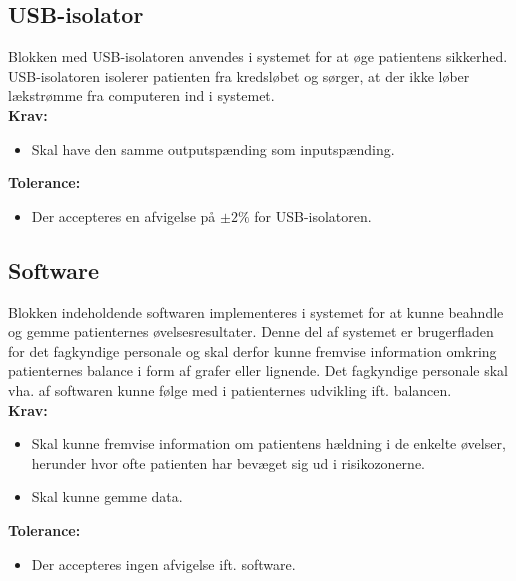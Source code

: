 \subsection{USB-isolator}\label{kravspecifikationer_USB}
Blokken med USB-isolatoren anvendes i systemet for at øge patientens sikkerhed. USB-isolatoren isolerer patienten fra kredsløbet og sørger, at der ikke løber lækstrømme fra computeren ind i systemet.\\
\textbf{Krav:}
\begin{itemize}
	\item Skal have den samme outputspænding som inputspænding. 
\end{itemize}
\textbf{Tolerance:}
\begin{itemize}
	\item Der accepteres en afvigelse på $\pm2\%$ for USB-isolatoren. 
\end{itemize}
\subsection{Software}
Blokken indeholdende softwaren implementeres i systemet for at kunne beahndle og gemme patienternes øvelsesresultater. Denne del af systemet er brugerfladen for det fagkyndige personale og skal derfor kunne fremvise information omkring patienternes balance i form af grafer eller lignende. Det fagkyndige personale skal vha. af softwaren kunne følge med i patienternes udvikling ift. balancen. \\
\textbf{Krav:}
\begin{itemize}
	\item Skal kunne fremvise information om patientens hældning i de enkelte øvelser, herunder hvor ofte patienten har bevæget sig ud i risikozonerne. 
	\item Skal kunne gemme data.
\end{itemize}
\textbf{Tolerance:}
\begin{itemize}
	\item Der accepteres ingen afvigelse ift. software. 
\end{itemize}